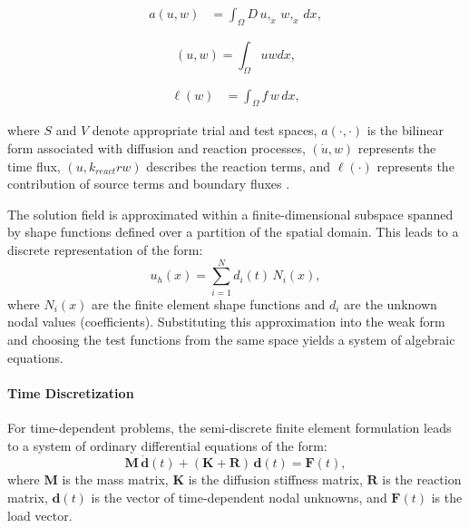 \documentclass[conference]{IEEEtran}
\begin{document}
\begin{equation}
\begin{aligned}
a(u,w) &=
\int_{\Omega}
D\, u,_x\, w,_x \, dx,
\end{aligned}
\label{eq:nitsche-bilinear-reaction}
\end{equation}

\begin{equation}
	(u,w) = \int_{\Omega} u w dx,
\end{equation}

\begin{equation}
\begin{aligned}
\ell(w) &=
\int_{\Omega}
f\, w \, dx,
\end{aligned}
\label{eq:nitsche-linear-reaction}
\end{equation}


where $S$ and $V$ denote appropriate trial and test spaces, $a(\cdot,\cdot)$ is
the bilinear form associated with diffusion and reaction processes, $(\dot{u},w)$ represents the time flux, $(u, k_{react} r w)$ describes the reaction terms, and 
$\ell(\cdot)$ represents the contribution of source terms and boundary fluxes \cite{b15}.

The solution field is approximated within a finite-dimensional subspace spanned
by shape functions defined over a partition of the spatial domain.
This leads to a discrete representation of the form:
\begin{equation}
u_h(x) = \sum_{i=1}^{N} d_i(t)\, N_i(x),
\end{equation}
where $N_i(x)$ are the finite element shape functions and $d_i$ are the unknown
nodal values (coefficients). Substituting this approximation into the weak form and choosing the test functions from the same space yields a system of algebraic equations.


\paragraph{Time Discretization}

For time-dependent problems, the semi-discrete finite element formulation
leads to a system of ordinary differential equations of the form:
\begin{equation}
\mathbf{M}\, \dot{\mathbf{d}}(t)
+
(\mathbf{K} + \mathbf{R})\, \mathbf{d}(t)
=
\mathbf{F}(t),
\label{eq:semi-discrete}
\end{equation}
where $\mathbf{M}$ is the mass matrix, $\mathbf{K}$ is the diffusion stiffness
matrix, $\mathbf{R}$ is the reaction matrix, $\mathbf{d}(t)$ is the vector of
time-dependent nodal unknowns, and $\mathbf{F}(t)$ is the load vector.
\end{document}
